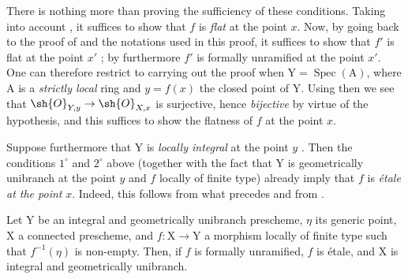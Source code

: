 \begin{remark}[18.10.2]
\begin{enumerate}[label=(\roman*)]
There is nothing more than proving the sufficiency of these conditions.
Taking into account , it suffices to show that $f$ is \emph{flat} at the point $x$.
Now, by going back to the proof of  and the notations used in this proof, it suffices to show that $f'$ is flat at the point $x'$ ; by  furthermore $f'$ is formally unramified at the point $x'$.
One can therefore restrict to carrying out the proof when $\mathrm{Y}=\operatorname{Spec}(\mathrm{A})$, where $\mathrm{A}$ is a \emph{strictly local} ring and $y=f(x)$ the closed point of $\mathrm{Y}$.
Using then  we see that $\sh{O}_{Y,y}\to\sh{O}_{X,x}$ is surjective, hence \emph{bijective} by virtue of the hypothesis, and this suffices to show the flatness of $f$ at the point $x$.

Suppose furthermore that $\mathrm{Y}$ is \emph{locally integral} at the point $y$ .
Then the conditions $1^{\circ}$ and $2^{\circ}$ above (together with the fact that $\mathrm{Y}$ is geometrically unibranch at the point $y$ and $f$ locally of finite type) already imply that $f$ is \emph{\'etale at the point} $x$.
Indeed, this follows from what precedes and from .
\end{enumerate}
\end{remark}

\begin{corollary}[18.10.3]
\label{IV.18.10.3}
Let $\mathrm{Y}$ be an integral and geometrically unibranch prescheme, $\eta$ its generic point, $\mathrm{X}$ a connected prescheme, and $f:\mathrm{X}\to\mathrm{Y}$ a morphism locally of finite type such that $f^{-1}(\eta)$ is non-empty.
Then, if $f$ is formally unramified, $f$ is \'etale, and $\mathrm{X}$ is integral and geometrically unibranch.
\end{corollary}

